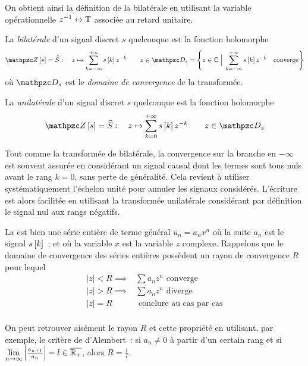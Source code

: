 On obtient ainsi la définition de la \teZ{} bilatérale en utilisant la
variable opérationnelle $z^{-1}\leftrightarrow \mathrm{T}$ associée au retard
unitaire.

\begin{definition} La \emph{\teZ{} bilatérale} d'un signal discret $s$
  quelconque est la fonction holomorphe
\begin{equation}
  \label{eq:transformee_en_z}
  \TZ\b{s} = \TZlui{S} : \quad z\mapsto \sum_{k=-\infty}^{+\infty}s\b{k}z^{-k} \quad\quad z \in \domDe{s}= \left\lbrace z\in\mathbb{C} \; \Big| \; \sum_{k=-\infty}^{+\infty}s\b{k}z^{-k} \quad \mathrm{converge}\right\rbrace
\end{equation}
où $\domDe{s}$ est le \emph{domaine de convergence} de la transformée.


La \emph{\teZ{} unilatérale} d'un signal discret $s$
  quelconque est la fonction holomorphe
\begin{equation}
  \label{eq:transformee_en_z_unilaterale}
  \TZ\b{s} = \TZlui{S} : \quad z\mapsto \sum_{k=0}^{+\infty}s\b{k}z^{-k} \quad\quad z \in \domDe{s}
\end{equation}
\end{definition}

Tout comme la transformée de \Laplace{} bilatérale, la convergence sur
la branche en $-\infty$ est souvent assurée en considérant un signal
causal dont les termes sont tous nuls avant le rang $k=0$, sans perte
de généralité. Cela revient à utiliser systématiquement l'échelon
unité pour annuler les signaux considérés. L'écriture est alors
facilitée en utilisant la transformée unilatérale considérant par
définition le signal nul aux rangs négatifs.

\begin{remarque}
  La \teZ{} est bien une série entière de terme général
  $ u_n= a_n x^n$ où la suite $a_n$ est le signal $s\b{k}$~; et où
  la variable $x$ est la variable $z$ complexe. Rappelons que le
  domaine de convergence des séries entières possèdent un rayon de
  convergence $R$ pour lequel
  $$
  \begin{array}{ll}
    |z|<R \implies  & \sum a_n z^n \text{ converge} \\
    |z|>R \implies  & \sum a_n z^n \text{ diverge} \\
    |z|=R  & \text{ conclure au cas par cas} \\

  \end{array}
  $$

  On peut retrouver aisément le rayon
  $R$ et cette propriété en utilisant, par exemple, le critère de
  d'Alembert~: si $a_n\neq0$ à partir d'un certain rang et si $
  \lim\limits_{n\to\infty} \left|\frac{a_{n+1}}{a_n}\right|=l \in
  \overline{\mathbb{R}_+}$, alors $R=\frac{1}{l}$.
\end{remarque}

